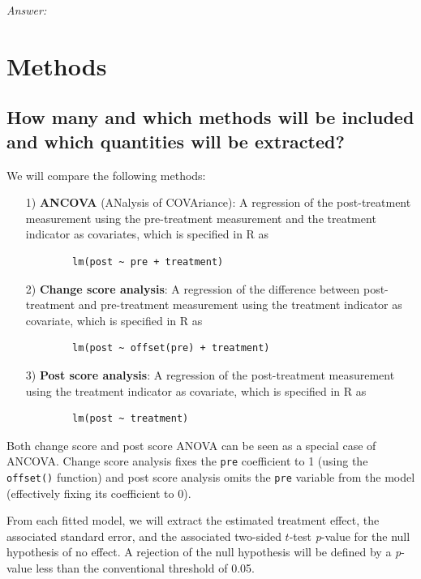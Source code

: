 \documentclass[12pt]{article}
\begin{document}
\textit{Answer:}

\section{Methods}
\subsection{How many and which methods will be included and which quantities will be extracted?}
    

\begin{examplebox}
We will compare the following methods:
    \begin{itemize}
    \item[1)] \textbf{ANCOVA} (ANalysis of COVAriance): A regression of the post-treatment measurement using the pre-treatment measurement and the treatment indicator as covariates,
    which is specified in R as 
    \begin{verbatim}
        lm(post ~ pre + treatment)
    \end{verbatim}
        
    \item[2)] \textbf{Change score analysis}: A regression of the difference between post-treatment and pre-treatment measurement using the treatment indicator as covariate,
    which is specified in R as 
    \begin{verbatim}
        lm(post ~ offset(pre) + treatment)
    \end{verbatim}
        
    \item[3)] \textbf{Post score analysis}: A regression of the post-treatment measurement using the treatment indicator as covariate,
    which is specified in R as 
    \begin{verbatim}
        lm(post ~ treatment)
    \end{verbatim}
\end{itemize}
Both change score and post score ANOVA can be seen as a special case of ANCOVA. Change score analysis fixes the \texttt{pre} coefficient to 1 (using the \texttt{offset()} function) and post score analysis omits the \texttt{pre} variable from the model (effectively fixing its coefficient to 0).

From each fitted model, we will extract the estimated treatment effect, the associated standard error, and the associated two-sided $t$-test \textit{p}-value for the null hypothesis of no effect. A rejection of the null hypothesis will be defined by a \textit{p}-value less than the conventional threshold of 0.05.
\end{examplebox} 
\end{document}
